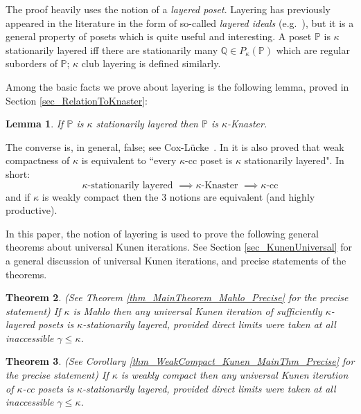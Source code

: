 \documentclass{amsart}
\newtheorem{theorem}{Theorem}
\newtheorem{lemma}[theorem]{Lemma}
\begin{document}
The proof heavily uses the notion of a \emph{layered poset}.  Layering has previously appeared in the literature in the form of so-called \emph{layered ideals} (e.g.\ \cite{MR942519}), but it is a general property of posets which is quite useful and interesting.  A poset $\mathbb{P}$ is $\kappa$ stationarily layered iff there are stationarily many $\mathbb{Q} \in P_\kappa(\mathbb{P})$ which are regular suborders of $\mathbb{P}$; $\kappa$ club layering is defined similarly.  



Among the basic facts we prove about layering is the following lemma, proved in Section \ref{sec_RelationToKnaster}:
\begin{lemma}\label{lem_LayeredImpliesKnaster}
If $\mathbb{P}$ is $\kappa$ stationarily layered then $\mathbb{P}$ is $\kappa$-Knaster.
\end{lemma}
The converse is, in general, false; see Cox-L\"ucke~\cite{Cox_Luecke}.  In \cite{Cox_Luecke} it is also proved that weak compactness of $\kappa$ is equivalent to ``every $\kappa$-cc poset is $\kappa$ stationarily layered".  In short:
\begin{equation*}
\kappa \text{-stationarily layered } \implies \kappa\text{-Knaster } \implies \kappa \text{-cc}
\end{equation*}
and if $\kappa$ is weakly compact then the 3 notions are equivalent (and highly productive).

In this paper, the notion of layering is used to prove the following general theorems about universal Kunen iterations.  See Section \ref{sec_KunenUniversal} for a general discussion of universal Kunen iterations, and precise statements of the theorems. 


\begin{theorem}\label{thm_MainTheorem_Mahlo_Imprecise}
(See Theorem \ref{thm_MainTheorem_Mahlo_Precise} for the precise statement)  If $\kappa$ is Mahlo then any universal Kunen iteration of sufficiently $\kappa$-layered posets is $\kappa$-stationarily layered, provided direct limits were taken at all inaccessible $\gamma \le \kappa$.  
\end{theorem}


\begin{theorem}\label{thm_WeakCompact_Kunen_MainThm_Imprecise}
(See Corollary \ref{thm_WeakCompact_Kunen_MainThm_Precise} for the precise statement)  If $\kappa$ is weakly compact then any universal Kunen iteration of $\kappa$-cc posets is $\kappa$-stationarily layered, provided direct limits were taken at all inaccessible $\gamma \le \kappa$.  
\end{theorem}
\end{document}
